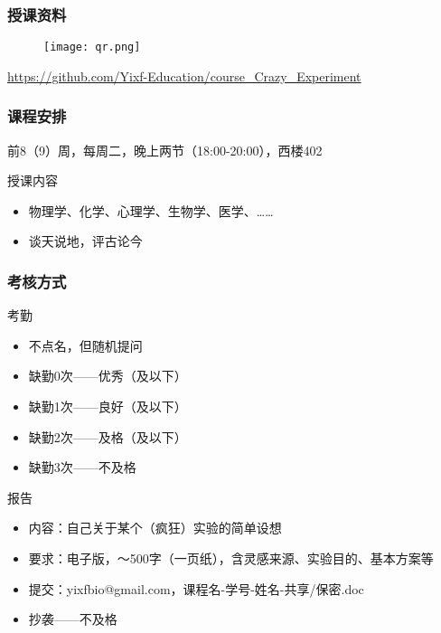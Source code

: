 \begin{frame}
  \frametitle{授课资料}
  \begin{figure}
    \centering
    \texttt{[image: qr.png]}
  \end{figure}
  \begin{center}
  \href{https://github.com/Yixf-Education/course_Crazy_Experiment}{https://github.com/Yixf-Education/course\_Crazy\_Experiment}
  \end{center}
\end{frame}

\begin{frame}
  \frametitle{课程安排}
  \begin{center}
  \alert{前8（9）周，每周二，晚上两节（18:00-20:00），西楼402}\\
  \vspace{0.2cm}
  \end{center}
  \begin{block}{授课内容}
    \begin{itemize}
      \item 物理学、化学、心理学、生物学、医学、……
      \item 谈天说地，评古论今
    \end{itemize}
  \end{block}
\end{frame}

\begin{frame}
  \frametitle{\alert{考核方式}}
  \begin{block}{考勤}
    \begin{itemize}
      \item 不点名，但随机提问
      \item 缺勤0次——优秀（及以下）
      \item 缺勤1次——良好（及以下）
      \item 缺勤2次——及格（及以下）
      \item 缺勤3次——不及格
    \end{itemize}
  \end{block}
  \pause
  \begin{block}{报告}
    \begin{itemize}
      \item 内容：自己关于某个（疯狂）实验的简单设想
      \item 要求：电子版，～500字（一页纸），含灵感来源、实验目的、基本方案等
      \item 提交：yixfbio@gmail.com，课程名-学号-姓名-共享/保密.doc
      \item 抄袭——不及格
    \end{itemize}
  \end{block}
\end{frame}

